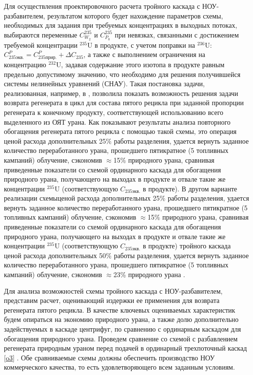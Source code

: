 Для осуществления проектировочного расчета тройного каскада с НОУ-разбавителем, результатом которого будет нахождение параметров схемы, необходимых для задания при требуемых концентрациях в выходных потоках, выбираются переменные $C_{W_2}^{235}$ и $C_{P_0}^{235}$ при невязках, связанными с достижением требуемой концентрации $^{235}$U в продукте, с учетом поправки на $^{236}$U: $C_{235 экв.}^{P}=C_{235 прир.}^{P}+\Delta C_{235}$, а также с выполнением ограничения на концентрацию $^{232}$U, задавая содержание этого изотопа в продукте равным предельно допустимому значению, что необходимо для решения получившейся системы нелинейных уравнений (СНАУ). Такая постановка задачи, реализованная, например, в \cite{gusevMultycascadeEnrichmentSchemes2020}, позволила показать возможность решения задачи возврата регенерата в цикл для состава пятого рецикла при заданной пропорции регенерата к конечному продукту, соответствующей использованию всего выделенного из ОЯТ урана. Как показывают результаты анализа повторного обогащения регенерата пятого рецикла с помощью такой схемы, это операция ценой расхода дополнительных 25\% работы разделения, удается вернуть заданное количество переработанного урана, прошедшего пятикратное (5 топливных кампаний) облучение, сэкономив $\approx$15\% природного урана, сравнивая приведенные показатели со схемой ординарного каскада для обогащения природного урана, получающего на выходах в продукте и отвале такие же концентрации $^{235}$U (соответствующую $C_{235 экв.}$ в продукте). В другом варианте реализации схемыценой расхода дополнительных 25\% работы разделения, удается вернуть заданное количество переработанного урана, прошедшего пятикратное (5 топливных кампаний) облучение, сэкономив $\approx$15\% природного урана, сравнивая приведенные показатели со схемой ординарного каскада для обогащения природного урана, получающего на выходах в продукте и отвале такие же концентрации $^{235}$U (соответствующую $C_{235 экв.}$ в продукте) тройного каскада ценой расхода дополнительных 50\% работы разделения, удается вернуть заданное количество переработанного урана, прошедшего пятикратное (5 топливных кампаний) облучение, сэкономив $\approx$23\% природного урана \cite{gusevMultycascadeEnrichmentSchemes2020}.


Для анализа возможностей схемы тройного каскада с НОУ-разбавителем, представим расчет, оценивающий издержки ее применения для возврата регенерата пятого рецикла. 
В качестве ключевых оцениваемых характеристик будем опираться на экономию природного урана, а также долю дополнительно задействуемых в каскаде центрифуг, по сравнению с ординарным каскадом для обогащения природного урана. Проведем сравнение со схемой с разбавлением регенерата природным ураном перед подачей в ординарный трехпоточный каскад \ref{o3} \cite{smirnovMethodEnrichReprocessed2019}. Обе сравниваемые схемы должны обеспечить производство НОУ коммерческого качества, то есть удовлетворяющего всем заданным условиям.

